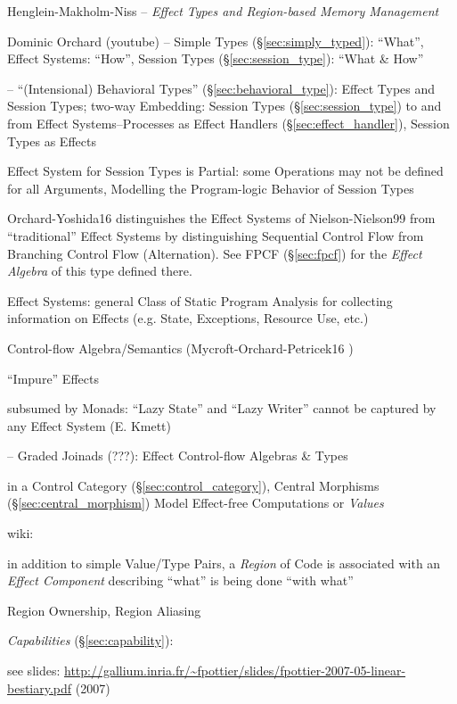 Henglein-Makholm-Niss -- \emph{Effect Types and Region-based Memory
Management}

Dominic Orchard (youtube) -- Simple Types (\S\ref{sec:simply_typed}):
``What'', Effect Systems: ``How'', Session Types
(\S\ref{sec:session_type}): ``What \& How''

\cite{orchard-yoshida16} -- ``(Intensional) Behavioral Types''
(\S\ref{sec:behavioral_type}): Effect Types and Session Types; two-way
Embedding: Session Types (\S\ref{sec:session_type}) to and from Effect
Systems--Processes as Effect Handlers (\S\ref{sec:effect_handler}),
Session Types as Effects

Effect System for Session Types is Partial: some Operations may not be
defined for all Arguments, Modelling the Program-logic Behavior of
Session Types \cite{orchard-yoshida16} %

\fist Orchard-Yoshida16 \cite{orchard-yoshida16} distinguishes the
Effect Systems of Nielson-Nielson99 \cite{nielson-nielson99} from
``traditional'' Effect Systems by distinguishing Sequential Control
Flow from Branching Control Flow (Alternation). See FPCF
(\S\ref{sec:fpcf}) for the \emph{Effect Algebra} of this type defined
there.

Effect Systems: general Class of Static Program Analysis for
collecting information on Effects (e.g. State, Exceptions, Resource
Use, etc.) \cite{orchard-yoshida16}

Control-flow Algebra/Semantics (Mycroft-Orchard-Petricek16
\cite{mycroft-orchard-petricek16})

``Impure'' Effects

subsumed by Monads: ``Lazy State'' and ``Lazy Writer'' cannot be
captured by any Effect System (E. Kmett)

\cite{mycroft-orchard-petricek16} -- Graded Joinads (???): Effect
Control-flow Algebras \& Types

in a Control Category (\S\ref{sec:control_category}), Central
Morphisms (\S\ref{sec:central_morphism}) Model Effect-free
Computations or \emph{Values} %

wiki:

in addition to simple Value/Type Pairs, a \emph{Region} of Code is
associated with an \emph{Effect Component} describing ``what'' is
being done ``with what''

Region Ownership, Region Aliasing


\emph{Capabilities} (\S\ref{sec:capability}):

\fist see slides:
\url{http://gallium.inria.fr/~fpottier/slides/fpottier-2007-05-linear-bestiary.pdf}
(2007)

